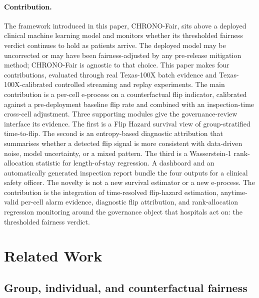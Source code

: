 \documentclass[acmsmall,nonacm,review,anonymous]{acmart}
\newcommand{\1}[1]{\mathbf{1}\!\left\{#1\right\}}
\begin{document}
\paragraph{Contribution.}
The framework introduced in this paper, CHRONO-Fair, sits above a deployed clinical machine learning model and monitors whether its thresholded fairness verdict continues to hold as patients arrive. The deployed model may be uncorrected or may have been fairness-adjusted by any pre-release mitigation method; CHRONO-Fair is agnostic to that choice. This paper makes four contributions, evaluated through real Texas-100X batch evidence and Texas-100X-calibrated controlled streaming and replay experiments. The main contribution is a per-cell e-process on a counterfactual flip indicator, calibrated against a pre-deployment baseline flip rate and combined with an inspection-time cross-cell adjustment. Three supporting modules give the governance-review interface its evidence. The first is a Flip Hazard survival view of group-stratified time-to-flip. The second is an entropy-based diagnostic attribution that summarises whether a detected flip signal is more consistent with data-driven noise, model uncertainty, or a mixed pattern. The third is a Wasserstein-1 rank-allocation statistic for length-of-stay regression. A dashboard and an automatically generated inspection report bundle the four outputs for a clinical safety officer. The novelty is not a new survival estimator or a new e-process. The contribution is the integration of time-resolved flip-hazard estimation, anytime-valid per-cell alarm evidence, diagnostic flip attribution, and rank-allocation regression monitoring around the governance object that hospitals act on: the thresholded fairness verdict.

\section{Related Work}\label{sec:related}

\subsection{Group, individual, and counterfactual fairness}
\end{document}
